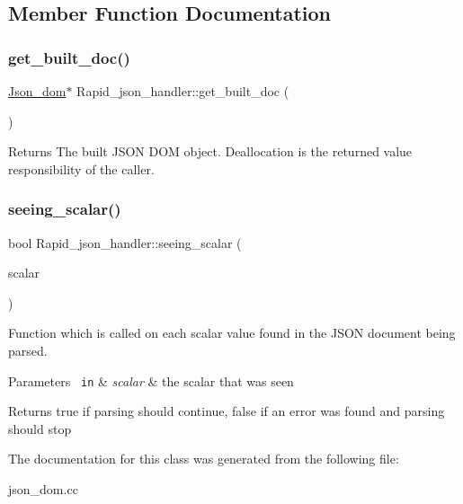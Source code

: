 \subsection{Member Function Documentation}
\mbox{\label{classRapid__json__handler_a8c1594ccddf96f8f8188a37d3e603ef9}} 
\subsubsection{\texorpdfstring{get\+\_\+built\+\_\+doc()}{get\_built\_doc()}}
{\footnotesize\ttfamily \mbox{\hyperlink{classJson__dom}{Json\+\_\+dom}}$\ast$ Rapid\+\_\+json\+\_\+handler\+::get\+\_\+built\+\_\+doc (\begin{DoxyParamCaption}{ }\end{DoxyParamCaption})\hspace{0.3cm}{\ttfamily [inline]}}

\begin{DoxyReturn}{Returns}
The built J\+S\+ON D\+OM object. Deallocation is the returned value responsibility of the caller. 
\end{DoxyReturn}
\mbox{\label{classRapid__json__handler_a6d2c68192aa1482a3094baef19df9229}} 
\subsubsection{\texorpdfstring{seeing\+\_\+scalar()}{seeing\_scalar()}}
{\footnotesize\ttfamily bool Rapid\+\_\+json\+\_\+handler\+::seeing\+\_\+scalar (\begin{DoxyParamCaption}\item[{\mbox{\hyperlink{classJson__scalar}{Json\+\_\+scalar}} $\ast$}]{scalar }\end{DoxyParamCaption})\hspace{0.3cm}{\ttfamily [inline]}}

Function which is called on each scalar value found in the J\+S\+ON document being parsed.


\begin{DoxyParams}[1]{Parameters}
\mbox{\texttt{ in}}  & {\em scalar} & the scalar that was seen \\
\hline
\end{DoxyParams}
\begin{DoxyReturn}{Returns}
true if parsing should continue, false if an error was found and parsing should stop 
\end{DoxyReturn}


The documentation for this class was generated from the following file\+:\begin{DoxyCompactItemize}
\item 
json\+\_\+dom.\+cc\end{DoxyCompactItemize}
